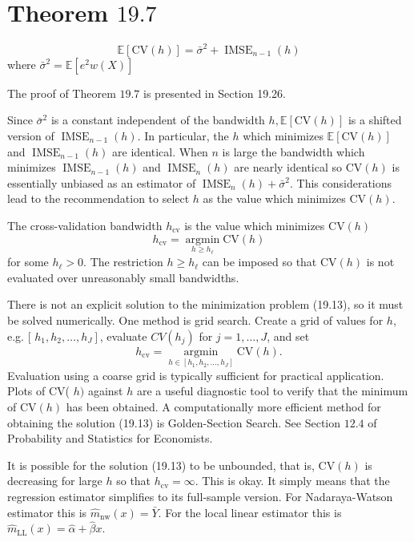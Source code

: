 \documentclass[10pt]{article}
\begin{document}
\section{Theorem $19.7$}
$$
\mathbb{E}[\mathrm{CV}(h)]=\bar{\sigma}^{2}+\operatorname{IMSE}_{n-1}(h)
$$
where $\bar{\sigma}^{2}=\mathbb{E}\left[e^{2} w(X)\right]$

The proof of Theorem $19.7$ is presented in Section 19.26.

Since $\bar{\sigma}^{2}$ is a constant independent of the bandwidth $h, \mathbb{E}[\mathrm{CV}(h)]$ is a shifted version of $\operatorname{IMSE}_{n-1}(h)$. In particular, the $h$ which minimizes $\mathbb{E}[\mathrm{CV}(h)]$ and $\operatorname{IMSE}_{n-1}(h)$ are identical. When $n$ is large the bandwidth which minimizes $\operatorname{IMSE}_{n-1}(h)$ and $\operatorname{IMSE}_{n}(h)$ are nearly identical so $\mathrm{CV}(h)$ is essentially unbiased as an estimator of $\operatorname{IMSE}_{n}(h)+\bar{\sigma}^{2}$. This considerations lead to the recommendation to select $h$ as the value which minimizes $\mathrm{CV}(h)$.

The cross-validation bandwidth $h_{\mathrm{cv}}$ is the value which minimizes $\mathrm{CV}(h)$
$$
h_{\mathrm{cv}}=\underset{h \geq h_{\ell}}{\operatorname{argmin}} \mathrm{CV}(h)
$$
for some $h_{\ell}>0$. The restriction $h \geq h_{\ell}$ can be imposed so that $\mathrm{CV}(h)$ is not evaluated over unreasonably small bandwidths.

There is not an explicit solution to the minimization problem (19.13), so it must be solved numerically. One method is grid search. Create a grid of values for $h$, e.g. [ $\left.h_{1}, h_{2}, \ldots, h_{J}\right]$, evaluate $C V\left(h_{j}\right)$ for $j=1, \ldots, J$, and set
$$
h_{\mathrm{cv}}=\underset{h \in\left[h_{1}, h_{2}, \ldots, h_{J}\right]}{\operatorname{argmin}} \mathrm{CV}(h) .
$$
Evaluation using a coarse grid is typically sufficient for practical application. Plots of CV( $h)$ against $h$ are a useful diagnostic tool to verify that the minimum of $\mathrm{CV}(h)$ has been obtained. A computationally more efficient method for obtaining the solution (19.13) is Golden-Section Search. See Section $12.4$ of Probability and Statistics for Economists.

It is possible for the solution (19.13) to be unbounded, that is, $\mathrm{CV}(h)$ is decreasing for large $h$ so that $h_{\mathrm{cv}}=\infty$. This is okay. It simply means that the regression estimator simplifies to its full-sample version. For Nadaraya-Watson estimator this is $\hat{m}_{\mathrm{nw}}(x)=\bar{Y}$. For the local linear estimator this is $\hat{m}_{\mathrm{LL}}(x)=\widehat{\alpha}+\widehat{\beta} x$.
\end{document}
